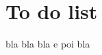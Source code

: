 \documentclass[10pt,a4paper]{article}
\begin{document}
\section{To do list}
bla bla bla
e poi bla
\end{document}
